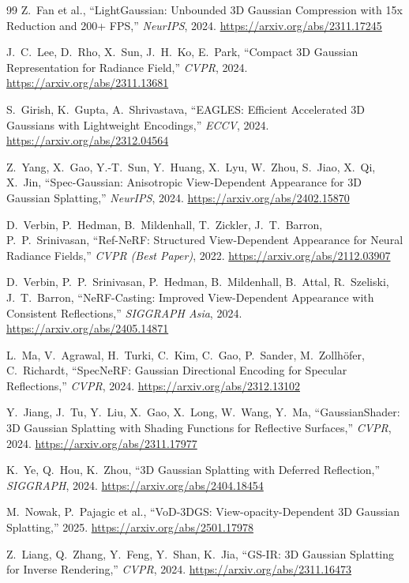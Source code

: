 \begin{thebibliography}{99}
 Z.~Fan et al., ``LightGaussian: Unbounded 3D Gaussian
Compression with 15x Reduction and 200+ FPS,'' \textit{NeurIPS}, 2024.
\url{https://arxiv.org/abs/2311.17245}

 J.~C.~Lee, D.~Rho, X.~Sun, J.~H.~Ko, E.~Park, ``Compact 3D
Gaussian Representation for Radiance Field,'' \textit{CVPR}, 2024.
\url{https://arxiv.org/abs/2311.13681}

 S.~Girish, K.~Gupta, A.~Shrivastava, ``EAGLES: Efficient
Accelerated 3D Gaussians with Lightweight Encodings,'' \textit{ECCV}, 2024.
\url{https://arxiv.org/abs/2312.04564}

 Z.~Yang, X.~Gao, Y.-T.~Sun, Y.~Huang, X.~Lyu, W.~Zhou,
S.~Jiao, X.~Qi, X.~Jin, ``Spec-Gaussian: Anisotropic View-Dependent Appearance for
3D Gaussian Splatting,'' \textit{NeurIPS}, 2024.
\url{https://arxiv.org/abs/2402.15870}

 D.~Verbin, P.~Hedman, B.~Mildenhall, T.~Zickler, J.~T.~Barron,
P.~P.~Srinivasan, ``Ref-NeRF: Structured View-Dependent Appearance for Neural
Radiance Fields,'' \textit{CVPR (Best Paper)}, 2022.
\url{https://arxiv.org/abs/2112.03907}

 D.~Verbin, P.~P.~Srinivasan, P.~Hedman, B.~Mildenhall,
B.~Attal, R.~Szeliski, J.~T.~Barron, ``NeRF-Casting: Improved View-Dependent
Appearance with Consistent Reflections,'' \textit{SIGGRAPH Asia}, 2024.
\url{https://arxiv.org/abs/2405.14871}

 L.~Ma, V.~Agrawal, H.~Turki, C.~Kim, C.~Gao, P.~Sander,
M.~Zollhöfer, C.~Richardt, ``SpecNeRF: Gaussian Directional Encoding for Specular
Reflections,'' \textit{CVPR}, 2024. \url{https://arxiv.org/abs/2312.13102}

 Y.~Jiang, J.~Tu, Y.~Liu, X.~Gao, X.~Long, W.~Wang, Y.~Ma,
``GaussianShader: 3D Gaussian Splatting with Shading Functions for Reflective
Surfaces,'' \textit{CVPR}, 2024. \url{https://arxiv.org/abs/2311.17977}

 K.~Ye, Q.~Hou, K.~Zhou, ``3D Gaussian Splatting with Deferred
Reflection,'' \textit{SIGGRAPH}, 2024. \url{https://arxiv.org/abs/2404.18454}

 M.~Nowak, P.~Pajagic et al., ``VoD-3DGS: View-opacity-Dependent
3D Gaussian Splatting,'' 2025. \url{https://arxiv.org/abs/2501.17978}

 Z.~Liang, Q.~Zhang, Y.~Feng, Y.~Shan, K.~Jia, ``GS-IR: 3D Gaussian
Splatting for Inverse Rendering,'' \textit{CVPR}, 2024.
\url{https://arxiv.org/abs/2311.16473}


\end{thebibliography}
